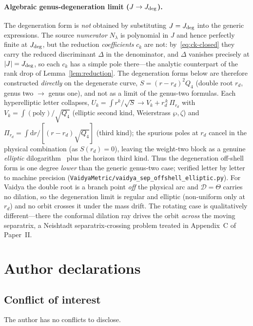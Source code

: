 \documentclass[12pt]{iopart}
\newcommand{\Jc}{J_{\rm deg}}
\newcommand{\dd}{\mathrm{d}}
\theoremstyle{plain}
\theoremstyle{definition}
\theoremstyle{plain}
\theoremstyle{remark}
\begin{document}
\paragraph{Algebraic genus-degeneration limit ($J\to\Jc$).} The degeneration form is
\emph{not} obtained by substituting $J=\Jc$ into the generic expressions. The source
\emph{numerator} $N_\lambda$ is polynomial in $J$ and hence perfectly finite at $\Jc$, but
the reduction \emph{coefficients} $c_k$ are not: by~\eqref{eq:ck-closed} they carry the
reduced discriminant $\Delta$ in the denominator, and $\Delta$ vanishes precisely at
$|J|=\Jc$, so each $c_k$ has a simple pole there---the analytic counterpart of the rank
drop of Lemma~\ref{lem:reduction}. The degeneration forms below are therefore constructed
\emph{directly} on the degenerate curve, $S=(r-r_d)^2Q_4$ (double root $r_d$, genus two
$\to$ genus one), and not as a limit of the genus-two formulas. Each hyperelliptic letter collapses,
$U_k=\int r^k/\sqrt S\to V_k+r_d^{\,k}\,\Pi_{r_d}$ with $V_k=\int(\text{poly})/\sqrt{Q_4}$
(elliptic second kind, Weierstrass $\wp,\zeta$) and $\Pi_{r_d}=\int\dd r/[(r-r_d)\sqrt{Q_4}]$
(third kind); the spurious poles at $r_d$ cancel in the physical combination (as
$S(r_d)=0$), leaving the weight-two block as a genuine \emph{elliptic}
dilogarithm~\cite{BeilinsonLevin1994,BrownLevin2011} plus the horizon third kind. Thus the
degeneration off-shell form is one degree \emph{lower} than the generic genus-two case;
verified letter by letter to machine precision
(\texttt{VaidyaMetric/vaidya\_sep\_offshell\_elliptic.py}). For Vaidya the double root is a
branch point \emph{off} the physical arc and $\mathcal D=\Theta$ carries no dilation, so
the degeneration limit is regular and elliptic (non-uniform only at $r_d$) and no
orbit crosses it under the mass drift. The rotating case is qualitatively
different---there the conformal dilation ray drives the orbit \emph{across} the moving
separatrix, a Neishtadt separatrix-crossing problem
\cite{Neishtadt1987,Neishtadt2013} treated in Appendix~C of Paper~II.



\FloatBarrier


\section*{Author declarations}

\subsection*{Conflict of interest}
The author has no conflicts to disclose.
\end{document}
